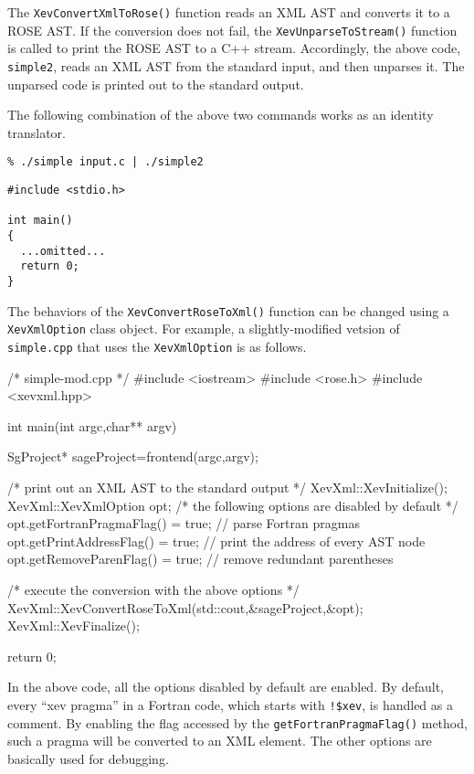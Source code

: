 The \texttt{XevConvertXmlToRose()} function reads an XML AST and
converts it to a ROSE AST. If the conversion does not fail, the
\texttt{XevUnparseToStream()} function is called to print the ROSE AST
to a C++ stream.  Accordingly, the above code, \texttt{simple2}, reads
an XML AST from the standard input, and then unparses it. The unparsed
code is printed out to the standard output.

The following combination of the above two commands works as an identity
translator.

\vspace{5mm}
\texttt{\% ./simple input.c | ./simple2 }
\begin{verbatim}
#include <stdio.h>

int main()
{
  ...omitted...
  return 0;
}
\end{verbatim}


The behaviors of the \texttt{XevConvertRoseToXml()} function can be
changed using a \texttt{XevXmlOption} class object. For example, a
slightly-modified vetsion of \texttt{simple.cpp} that uses the
\texttt{XevXmlOption} is as follows.
\begin{framed}
\begin{src}
/* simple-mod.cpp */
#include <iostream>
#include <rose.h>
#include <xevxml.hpp>

int main(int argc,char** argv){
  SgProject* sageProject=frontend(argc,argv);

  /* print out an XML AST to the standard output */
  XevXml::XevInitialize();
  XevXml::XevXmlOption opt; 
  /* the following options are disabled by default */
  opt.getFortranPragmaFlag() = true; // parse Fortran pragmas
  opt.getPrintAddressFlag() = true; // print the address of every AST node 
  opt.getRemoveParenFlag() = true; // remove redundant parentheses

  /* execute the conversion with the above options */
  XevXml::XevConvertRoseToXml(std::cout,&sageProject,&opt);
  XevXml::XevFinalize();

  return 0; 
}
\end{src}
\end{framed}

In the above code, all the options disabled by default are enabled.  By
default, every ``xev pragma'' in a Fortran code, which starts with
\texttt{!\$xev}, is handled as a comment.  By enabling the flag accessed
by the \texttt{getFortranPragmaFlag()} method, such a pragma will be
converted to an XML element. The other options are basically used for
debugging.

